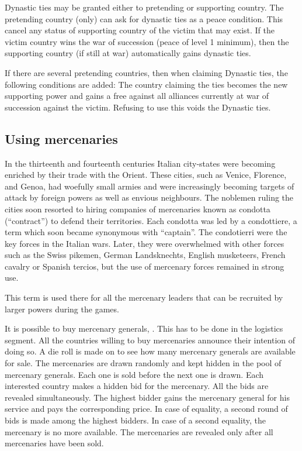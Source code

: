  Dynastic ties may be granted either to
pretending or supporting country.
\bparag The pretending country (only) can ask for dynastic ties as a peace
condition. This cancel any status of supporting country of the victim that may
exist.
\bparag If the victim country wins the war of succession (peace of level 1
minimum), then the supporting country (if still at war) automatically gains
dynastic ties.

 If there are several pretending
countries, then when claiming Dynastic ties, the following conditions are
added:
\bparag The country claiming the ties becomes the new supporting power and
gains a free \CB against all alliances currently at war of succession against
the victim.
\bparag Refusing to use this \CB voids the Dynastic ties.



\subsection{Using mercenaries}\label{chSpecific:Mercenaries}

\begin{histoire}[Condottieri]
  In the thirteenth and fourteenth centuries Italian city-states were becoming
  enriched by their trade with the Orient. These cities, such as Venice,
  Florence, and Genoa, had woefully small armies and were increasingly
  becoming targets of attack by foreign powers as well as envious
  neighbours. The noblemen ruling the cities soon resorted to hiring companies
  of mercenaries known as condotta (``contract'') to defend their
  territories. Each condotta was led by a condottiere, a term which soon
  became synonymous with ``captain''. The condotierri were the key forces in
  the Italian wars. Later, they were overwhelmed with other forces such as the
  Swiss pikemen, German Landsknechts, English musketeers, French cavalry or
  Spanish tercios, but the use of mercenary forces remained in strong use.

  This term is used there for all the mercenary leaders that can be recruited
  by larger powers during the games.
\end{histoire}
\aparag It is possible to buy mercenary generals, . This has to be done in the
logistics segment.
\bparag All the countries willing to buy mercenaries announce their intention
of doing so.
\bparag A die roll is made on  to see how many
mercenary generals are available for sale.
\bparag The mercenaries are drawn randomly and kept hidden in the pool of
mercenary generals. Each one is sold before the next one is drawn.
\bparag Each interested country makes a hidden bid for the mercenary. All the
bids are revealed simultaneously.
\bparag The highest bidder gains the mercenary general for his service and
pays the corresponding price. In case of equality, a second round of bids is
made among the highest bidders. In case of a second equality, the mercenary is
no more available.
\bparag The mercenaries are revealed only after all mercenaries have been
sold.

